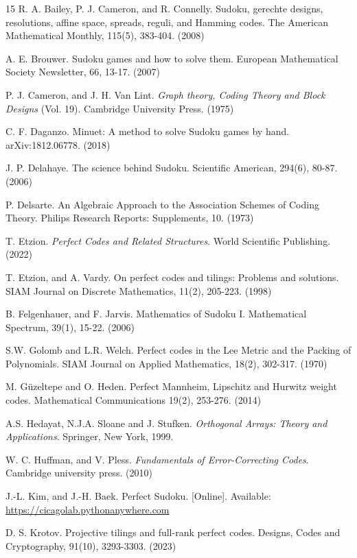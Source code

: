 \documentclass{article}
\theoremstyle{definition}
\begin{document}
\begin{thebibliography}{15}
     R. A. Bailey, P. J. Cameron, and R. Connelly. Sudoku, gerechte designs, resolutions, affine space, spreads, reguli, and Hamming codes. The American Mathematical Monthly, 115(5), 383-404. (2008)

	 A. E. Brouwer. Sudoku games and how to solve them. European Mathematical Society Newsletter, 66, 13-17. (2007)
	
	 P. J. Cameron, and J. H. Van Lint. \textit{Graph theory, Coding Theory and Block Designs} (Vol. 19). Cambridge University Press. (1975)

    C. F. Daganzo. Minuet: A method to solve Sudoku games by hand. arXiv:1812.06778. (2018)

	 J. P. Delahaye. The science behind Sudoku. Scientific American, 294(6), 80-87. (2006)
	
	 P. Delsarte. An Algebraic Approach to the Association Schemes of Coding Theory. Philips Research Reports: Supplements, 10. (1973)

     T. Etzion. \textit{Perfect Codes and Related Structures}. World Scientific Publishing. (2022)
	
	 T. Etzion, and A. Vardy. On perfect codes and tilings: Problems and solutions. SIAM Journal on Discrete Mathematics, 11(2), 205-223. (1998)
	
	 B. Felgenhauer, and F. Jarvis. Mathematics of Sudoku I. Mathematical Spectrum, 39(1), 15-22. (2006)
	
	 S.W. Golomb and L.R. Welch. Perfect codes in the Lee Metric and the Packing of Polynomials. SIAM Journal on Applied Mathematics, 18(2), 302-317. (1970)

     M. Güzeltepe and O. Heden. Perfect Mannheim, Lipschitz and Hurwitz weight codes. Mathematical Communications 19(2), 253-276. (2014)

	 A.S. Hedayat, N.J.A. Sloane and J. Stufken. \textit{Orthogonal Arrays: Theory and Applications}. Springer, New York, 1999.
	
	 W. C. Huffman, and V. Pless. \textit{Fundamentals of Error-Correcting Codes}. Cambridge university press. (2010)

     J.-L. Kim, and J.-H. Baek. Perfect Sudoku. [Online]. Available: \url{https://cicagolab.pythonanywhere.com}
	
	 D. S. Krotov. Projective tilings and full-rank perfect codes. Designs, Codes and Cryptography, 91(10), 3293-3303. (2023)
	

\end{thebibliography}
\end{document}
